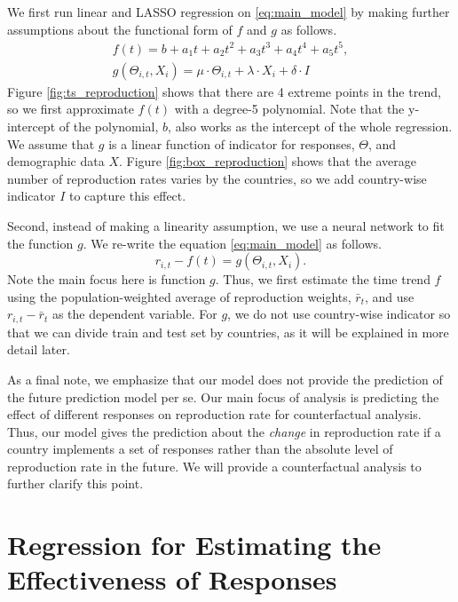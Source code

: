 \documentclass[11pt]{article}
\begin{document}
We first run linear and LASSO regression on \eqref{eq:main_model} by making further assumptions about the functional form of $f$ and $g$ as follows.
\begin{gather}
    f(t) = b + a_1t + a_2t^2 + a_3t^3 + a_4 t^4 + a_5 t^5,\label{eq:lr_model1}\\
    g(\Theta_{i,t},X_i) = \mu\cdot\Theta_{i,t} + \lambda \cdot X_i + \delta\cdot I\label{eq:lr_model2}
\end{gather}
Figure \ref{fig:ts_reproduction} shows that there are 4 extreme points in the trend, so we first approximate $f(t)$ with a degree-5 polynomial. Note that the y-intercept of the polynomial, $b$, also works as the intercept of the whole regression. We assume that $g$ is a linear function of indicator for responses, $\Theta$, and demographic data $X$. Figure \ref{fig:box_reproduction} shows that the average number of reproduction rates varies by the countries, so we add country-wise indicator $I$ to capture this effect.

Second, instead of making a linearity assumption, we use a neural network to fit the function $g$. We re-write the equation \eqref{eq:main_model} as follows.
\begin{equation}
    r_{i,t} - f(t) = g(\Theta_{i,t},X_i).\label{eq:nn_model}
\end{equation}
Note the main focus here is function $g$. Thus, we first estimate the time trend $f$ using the population-weighted average of reproduction weights, $\bar{r}_t$, and use $r_{i,t} - \bar{r}_t$ as the dependent variable. For $g$, we do not use country-wise indicator so that we can divide train and test set by countries, as it will be explained in more detail later.

As a final note, we emphasize that our model does not provide the prediction of the future prediction model per se. Our main focus of analysis is predicting the effect of different responses on reproduction rate for counterfactual analysis. Thus, our model gives the prediction about the \textit{change} in reproduction rate if a country implements a set of responses rather than the absolute level of reproduction rate in the future. We will provide a counterfactual analysis to further clarify this point.

\section{Regression for Estimating the Effectiveness of Responses}
\end{document}
